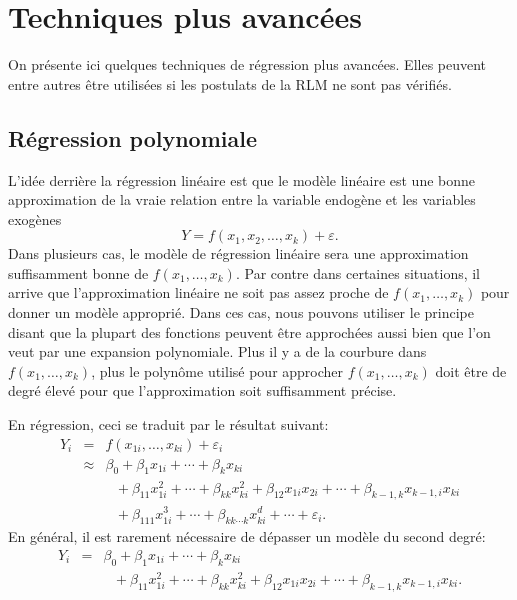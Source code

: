 
\chapter{Techniques plus avancées}
\label{sec:TechniquesAvancees}

On présente ici quelques techniques de régression plus avancées. Elles peuvent entre autres être utilisées si les postulats de la RLM ne sont pas vérifiés.


\section{Régression polynomiale}
\label{sec:regpoly}

L'idée derrière la régression linéaire est que le modèle
linéaire est une bonne approximation de la \og vraie \fg relation
entre la variable endogène et les variables exogènes
$$Y=f(x_1,x_2,\ldots,x_k)+\varepsilon.$$
Dans plusieurs cas, le modèle de régression linéaire sera
une approximation suffisamment bonne de $f(x_1,\ldots,x_k)$. Par
contre dans certaines situations, il arrive que l'approximation
linéaire ne soit pas assez proche de $f(x_1,\ldots,x_k)$ pour
donner un modèle approprié. Dans ces cas, nous pouvons
utiliser le principe disant que la plupart des fonctions peuvent
\^etre approchées aussi bien que l'on veut par une expansion
polynomiale. Plus il y a de la \og courbure \fg dans
$f(x_1,\ldots,x_k)$, plus le polyn\^ome utilisé pour
approcher $f(x_1,\ldots,x_k)$ doit \^etre de degré élevé
pour que l'approximation soit suffisamment précise.

En régression, ceci se traduit par le résultat suivant:
\begin{eqnarray*}
Y_i&=&f(x_{1i},\ldots,x_{ki})+\varepsilon_i\\
&\approx&\beta_0+\beta_1x_{1i}+\cdots+\beta_kx_{ki}\\
&\ &\ \ \ +\beta_{11}x_{1i}^2+\cdots+\beta_{kk}x_{ki}^2+
\beta_{12}x_{1i}x_{2i}+\cdots+\beta_{k-1,k}x_{k-1,i}x_{ki}\\
&\ & \ \ \ +\beta_{111}x_{1i}^3+\cdots+ \beta_{kk\cdots
k}x_{ki}^d+\cdots+\varepsilon_i.
\end{eqnarray*}
En général, il est rarement nécessaire de dépasser un modèle du second degré:
\begin{eqnarray*}
Y_i&=&\beta_0+\beta_1x_{1i}+\cdots+\beta_kx_{ki}\\
&\ &\ \ \ +\beta_{11}x_{1i}^2+\cdots+\beta_{kk}x_{ki}^2+
\beta_{12}x_{1i}x_{2i}+\cdots+\beta_{k-1,k}x_{k-1,i}x_{ki}.
\end{eqnarray*}

